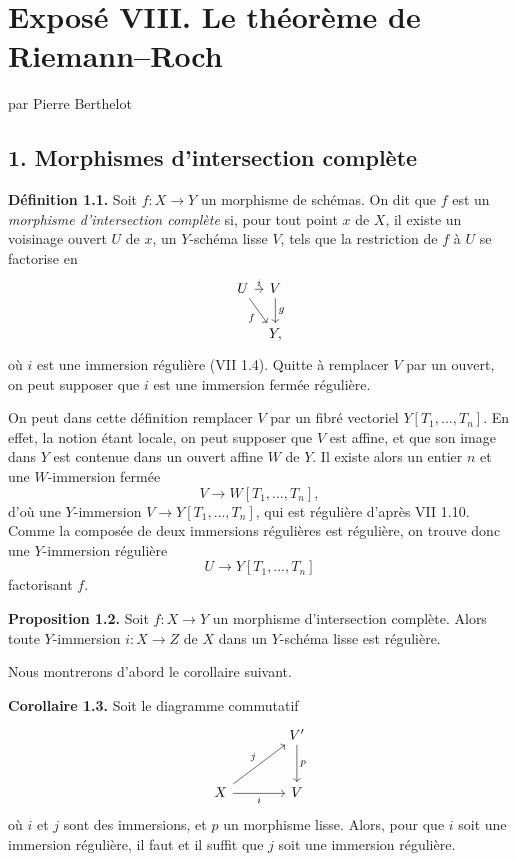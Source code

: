 \documentclass[11pt]{article}
\begin{document}
\providecommand{\etale}{\'etale}
\providecommand{\Ch}{\operatorname{Ch}}


\section*{Exposé VIII. Le théorème de Riemann--Roch}
\begin{center}
par Pierre Berthelot
\end{center}

\subsection*{1. Morphismes d'intersection complète}

\textbf{Définition 1.1.} Soit $f:X\to Y$ un morphisme de schémas. On dit que $f$ est un \emph{morphisme d'intersection complète} si, pour tout point $x$ de $X$, il existe un voisinage ouvert $U$ de $x$, un $Y$-schéma lisse $V$, tels que la restriction de $f$ à $U$ se factorise en
\[
\begin{tikzcd}[column sep=tiny]
U \arrow[r,"i"] \arrow[dr,"f"'] & V \arrow[d,"g"]\\
& Y,
\end{tikzcd}
\]
où $i$ est une immersion régulière (VII 1.4). Quitte à remplacer $V$ par un ouvert, on peut supposer que $i$ est une immersion fermée régulière.

On peut dans cette définition remplacer $V$ par un fibré vectoriel $Y[T_1,\ldots,T_n]$. En effet, la notion étant locale, on peut supposer que $V$ est affine, et que son image dans $Y$ est contenue dans un ouvert affine $W$ de $Y$. Il existe alors un entier $n$ et une $W$-immersion fermée
\[
V\longrightarrow W[T_1,\ldots,T_n],
\]
d'où une $Y$-immersion $V\to Y[T_1,\ldots,T_n]$, qui est régulière d'après VII 1.10. Comme la composée de deux immersions régulières est régulière, on trouve donc une $Y$-immersion régulière
\[
U\longrightarrow Y[T_1,\ldots,T_n]
\]
factorisant $f$.

\textbf{Proposition 1.2.} Soit $f:X\to Y$ un morphisme d'intersection complète. Alors toute $Y$-immersion $i:X\to Z$ de $X$ dans un $Y$-schéma lisse est régulière.

Nous montrerons d'abord le corollaire suivant.

\textbf{Corollaire 1.3.} Soit le diagramme commutatif
\[
\begin{tikzcd}[column sep=large,row sep=large]
& V' \arrow[d,"p"]\\
X \arrow[ur,"j"] \arrow[r,"i"'] & V
\end{tikzcd}
\]
où $i$ et $j$ sont des immersions, et $p$ un morphisme lisse. Alors, pour que $i$ soit une immersion régulière, il faut et il suffit que $j$ soit une immersion régulière.
\end{document}
